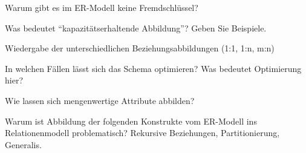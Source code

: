 \begin{fragen}
	\item Warum gibt es im ER-Modell keine Fremdschlüssel?
	\item Was bedeutet ``kapazitätserhaltende Abbildung''? Geben Sie Beispiele.
	\item Wiedergabe der unterschiedlichen Beziehungsabbildungen (1:1, 1:n, m:n)
	\item In welchen Fällen lässt sich das Schema optimieren? Was bedeutet Optimierung hier?
	\item Wie lassen sich mengenwertige Attribute abbilden?
	\item Warum ist Abbildung der folgenden Konstrukte vom ER-Modell ins Relationenmodell problematisch? Rekursive Beziehungen, Partitionierung, Generalis.
\end{fragen}